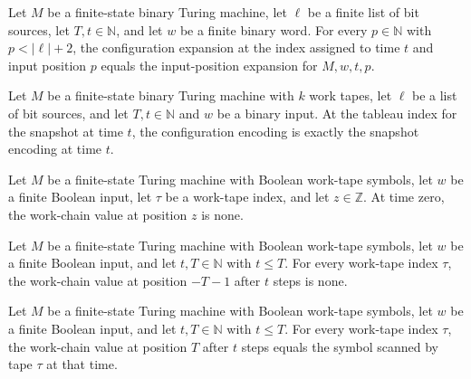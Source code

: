 \begin{theorem}
\label{Complexity.cfgExp_inpIdx}
\leanok
{}
Let $M$ be a finite-state binary Turing machine, let $\ell$ be a finite list of bit
sources, let $T,t\in\mathbb{N}$, and let $w$ be a finite binary word. For every
$p\in\mathbb{N}$ with $p<|\ell|+2$, the configuration expansion at the index assigned to
time $t$ and input position $p$ equals the input-position expansion for $M,w,t,p$.
\end{theorem}

\begin{theorem}
\label{Complexity.cfgExp_snapIdx}
\leanok
{}
Let $M$ be a finite-state binary Turing machine with $k$ work tapes, let $\ell$ be a
list of bit sources, and let $T,t\in\mathbb N$ and $w$ be a binary input. At the tableau
index for the snapshot at time $t$, the configuration encoding is exactly the snapshot
encoding at time $t$.
\end{theorem}

\begin{theorem}
\label{Complexity.workChain_zero}
\leanok
{}
Let $M$ be a finite-state Turing machine with Boolean work-tape symbols, let $w$ be a
finite Boolean input, let $\tau$ be a work-tape index, and let $z\in\mathbb{Z}$. At time
zero, the work-chain value at position $z$ is none.
\end{theorem}

\begin{theorem}
\label{Complexity.workChain_left}
\leanok
{}
Let $M$ be a finite-state Turing machine with Boolean work-tape symbols, let $w$ be a
finite Boolean input, and let $t,T\in\mathbb{N}$ with $t\le T$. For every work-tape
index $\tau$, the work-chain value at position $-T-1$ after $t$ steps is none.
\end{theorem}

\begin{theorem}
\label{Complexity.workChain_right}
\leanok
{}
Let $M$ be a finite-state Turing machine with Boolean work-tape symbols, let $w$ be a
finite Boolean input, and let $t,T\in\mathbb{N}$ with $t\le T$. For every work-tape
index $\tau$, the work-chain value at position $T$ after $t$ steps equals the symbol
scanned by tape $\tau$ at that time.
\end{theorem}

